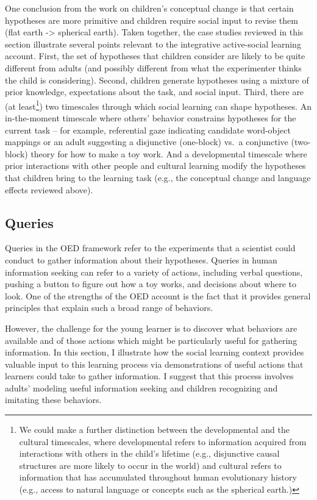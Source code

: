 \documentclass[english,floatsintext,man]{apa6}
\theoremstyle{definition}
\theoremstyle{definition}
\theoremstyle{definition}
\theoremstyle{remark}
\begin{document}
One conclusion from the work on children's conceptual change is that
certain hypotheses are more primitive and children require social input
to revise them (flat earth -\textgreater{} spherical earth). Taken
together, the case studies reviewed in this section illustrate several
points relevant to the integrative active-social learning account.
First, the set of hypotheses that children consider are likely to be
quite different from adults (and possibly different from what the
experimenter thinks the child is considering). Second, children generate
hypotheses using a mixture of prior knowledge, expectations about the
task, and social input. Third, there are (at least\footnote{We could
  make a further distinction between the developmental and the cultural
  timescales, where developmental refers to information acquired from
  interactions with others in the child's lifetime (e.g., disjunctive
  causal structures are more likely to occur in the world) and cultural
  refers to information that has accumulated throughout human
  evolutionary history (e.g., access to natural language or concepts
  such as the spherical earth.)}) two timescales through which social
learning can shape hypotheses. An in-the-moment timescale where others'
behavior constrains hypotheses for the current task -- for example,
referential gaze indicating candidate word-object mappings or an adult
suggesting a disjunctive (one-block) vs.~a conjunctive (two-block)
theory for how to make a toy work. And a developmental timescale where
prior interactions with other people and cultural learning modify the
hypotheses that children bring to the learning task (e.g., the
conceptual change and language effects reviewed above).

\subsection{Queries}\label{queries}

Queries in the OED framework refer to the experiments that a scientist
could conduct to gather information about their hypotheses. Queries in
human information seeking can refer to a variety of actions, including
verbal questions, pushing a button to figure out how a toy works, and
decisions about where to look. One of the strengths of the OED account
is the fact that it provides general principles that explain such a
broad range of behaviors.

However, the challenge for the young learner is to discover what
behaviors are available and of those actions which might be particularly
useful for gathering information. In this section, I illustrate how the
social learning context provides valuable input to this learning process
via demonstrations of useful actions that learners could take to gather
information. I suggest that this process involves adults' modeling
useful information seeking and children recognizing and imitating these
behaviors.
\end{document}
